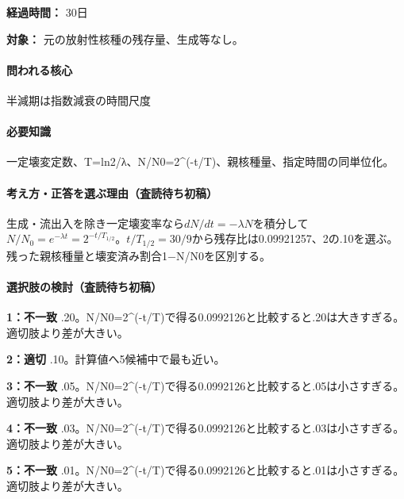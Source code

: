 \noindent\textbf{経過時間：} 30日\par

\noindent\textbf{対象：} 元の放射性核種の残存量、生成等なし。\par

\paragraph{問われる核心} 半減期は指数減衰の時間尺度

\paragraph{必要知識} 一定壊変定数、T=\allowbreak{}ln2/λ、N/N0=\allowbreak{}2\textasciicircum{}(-t/T)、親核種量、指定時間の同単位化。

\paragraph{考え方・正答を選ぶ理由（査読待ち初稿）} 生成・流出入を除き一定壊変率なら\(dN/dt=-\lambda N\)を積分して\(N/N_0=e^{-\lambda t}=2^{-t/T_{1/2}}\)。\(t/T_{1/2}=30/9\)から残存比は0.09921257、2の.10を選ぶ。残った親核種量と壊変済み割合1−N/N0を区別する。

\paragraph{選択肢の検討（査読待ち初稿）}\mbox{}\par

\noindent\textbf{1：不一致} .20。N/N0=\allowbreak{}2\textasciicircum{}(-t/T)で得る0.0992126と比較すると.20は大きすぎる。 適切肢より差が大きい。\par

\noindent\textbf{2：適切} .10。計算値へ5候補中で最も近い。\par

\noindent\textbf{3：不一致} .05。N/N0=\allowbreak{}2\textasciicircum{}(-t/T)で得る0.0992126と比較すると.05は小さすぎる。 適切肢より差が大きい。\par

\noindent\textbf{4：不一致} .03。N/N0=\allowbreak{}2\textasciicircum{}(-t/T)で得る0.0992126と比較すると.03は小さすぎる。 適切肢より差が大きい。\par

\noindent\textbf{5：不一致} .01。N/N0=\allowbreak{}2\textasciicircum{}(-t/T)で得る0.0992126と比較すると.01は小さすぎる。 適切肢より差が大きい。\par


